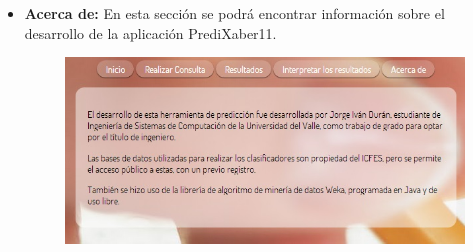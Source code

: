 \documentclass{article}
\begin{document}
\begin{itemize}
\begin{figure}[H]
\label{fig:figura6}
\end{figure}
\item \textbf{Acerca de:} En esta sección se podrá encontrar información sobre el desarrollo de la aplicación PrediXaber11.
\begin{figure}[H]
\begin{centering}
\includegraphics[scale=0.5]{about}
\par\end{centering}
\label{fig:figura6}
\end{figure}
\end{itemize}
\end{document}
